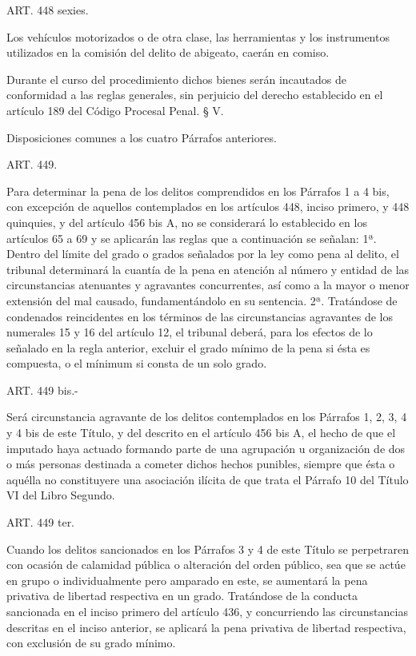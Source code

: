     ART. 448 sexies.

    Los vehículos motorizados o de otra clase, las herramientas y los instrumentos utilizados en la comisión del delito de abigeato, caerán en comiso.

    Durante el curso del procedimiento dichos bienes serán incautados de conformidad a las reglas generales, sin perjuicio del derecho establecido en el artículo 189 del Código Procesal Penal.
    § V.

    Disposiciones comunes a los cuatro Párrafos anteriores.





   
    ART. 449.

    Para determinar la pena de los delitos comprendidos en los Párrafos 1 a 4 bis, con excepción de aquellos contemplados en los artículos 448, inciso primero, y 448 quinquies, y del artículo 456 bis A, no se considerará lo establecido en los artículos 65 a 69 y se aplicarán las reglas que a continuación se señalan:
    1ª. Dentro del límite del grado o grados señalados por la ley como pena al delito, el tribunal determinará la cuantía de la pena en atención al número y entidad de las circunstancias atenuantes y agravantes concurrentes, así como a la mayor o menor extensión del mal causado, fundamentándolo en su sentencia.
    2ª. Tratándose de condenados reincidentes en los términos de las circunstancias agravantes de los numerales 15 y 16 del artículo 12, el tribunal deberá, para los efectos de lo señalado en la regla anterior, excluir el grado mínimo de la pena si ésta es compuesta, o el mínimum si consta de un solo grado.

    ART. 449 bis.-

    Será circunstancia agravante de los delitos contemplados en los Párrafos 1, 2, 3, 4 y 4 bis de este Título, y del descrito en el artículo 456 bis A, el hecho de que el imputado haya actuado formando parte de una agrupación u organización de dos o más personas destinada a cometer dichos hechos punibles, siempre que ésta o aquélla no constituyere una asociación ilícita de que trata el Párrafo 10 del Título VI del Libro Segundo.



    ART. 449 ter.

    Cuando los delitos sancionados en los Párrafos 3 y 4 de este Título se perpetraren con ocasión de calamidad pública o alteración del orden público, sea que se actúe en grupo o individualmente pero amparado en este, se aumentará la pena privativa de libertad respectiva en un grado.
    Tratándose de la conducta sancionada en el inciso primero del artículo 436, y concurriendo las circunstancias descritas en el inciso anterior, se aplicará la pena privativa de libertad respectiva, con exclusión de su grado mínimo.




